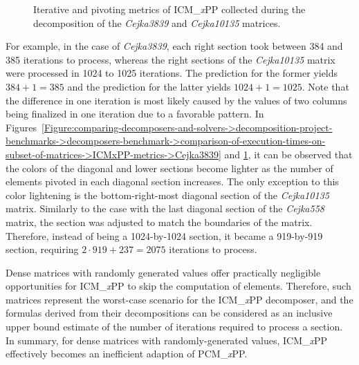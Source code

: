 \begin{figure}[ht!]
\begin{subfigure}[t]{0.48\textwidth}
		\label{Figure:comparing-decomposers-and-solvers->decomposition-project-benchmarks->decomposers-benchmark->comparison-of-execution-times-on-subset-of-matrices->ICMxPP-metrics->Cejka10135}
	\end{subfigure}
	\caption{Iterative and pivoting metrics of ICM\_\textit{x}PP collected during the decomposition of the \textit{Cejka3839} and \textit{Cejka10135} matrices.}
	\label{Figure:comparing-decomposers-and-solvers->decomposition-project-benchmarks->decomposers-benchmark->comparison-of-execution-times-on-subset-of-matrices->ICMxPP-metrics->Cejka3839-and-Cejka10135}
\end{figure}

For example, in the case of \textit{Cejka3839}, each right section took between 384 and 385 iterations to process, whereas the right sections of the \textit{Cejka10135} matrix were processed in 1024 to 1025 iterations. The prediction for the former yields $384 + 1 = 385$ and the prediction for the latter yields $1024 + 1 = 1025$. Note that the difference in one iteration is most likely caused by the values of two columns being finalized in one iteration due to a favorable pattern. In Figures~\ref{Figure:comparing-decomposers-and-solvers->decomposition-project-benchmarks->decomposers-benchmark->comparison-of-execution-times-on-subset-of-matrices->ICMxPP-metrics->Cejka3839} and \ref{Figure:comparing-decomposers-and-solvers->decomposition-project-benchmarks->decomposers-benchmark->comparison-of-execution-times-on-subset-of-matrices->ICMxPP-metrics->Cejka10135}, it can be observed that the colors of the diagonal and lower sections become lighter as the number of elements pivoted in each diagonal section increases. The only exception to this color lightening is the bottom-right-most diagonal section of the \textit{Cejka10135} matrix. Similarly to the case with the last diagonal section of the \textit{Cejka558} matrix, the section was adjusted to match the boundaries of the matrix. Therefore, instead of being a 1024-by-1024 section, it became a 919-by-919 section, requiring $2\cdot 919 + 237 = 2075$ iterations to process.

Dense matrices with randomly generated values offer practically negligible opportunities for ICM\_\textit{x}PP to skip the computation of elements. Therefore, such matrices represent the worst-case scenario for the ICM\_\textit{x}PP decomposer, and the formulas derived from their decompositions can be considered as an inclusive upper bound estimate of the number of iterations required to process a section. In summary, for dense matrices with randomly-generated values, ICM\_\textit{x}PP effectively becomes an inefficient adaption of PCM\_\textit{x}PP.

